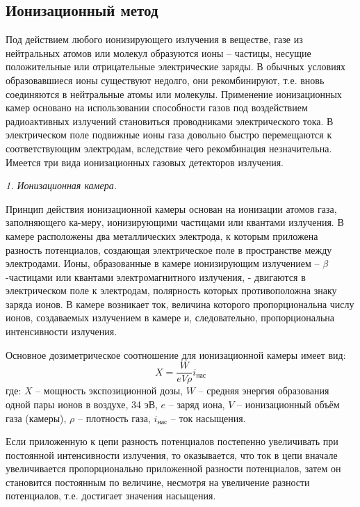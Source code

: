 \documentclass[14pt,pscyr,titlepage]{hedreport}
\begin{document}
	\subsection{Ионизационный метод} 
		Под действием любого ионизирующего излучения в веществе, газе из 
		нейтральных атомов или молекул образуются ионы -- частицы, несущие 
		положительные или отрицательные электрические заряды. В обычных 
		условиях образовавшиеся ионы существуют недолго, они рекомбинируют, 
		т.е. вновь соединяются в нейтральные атомы или молекулы. Применение 
		ионизационных камер основано на использовании способности газов под 
		воздействием радиоактивных излучений становиться проводниками 
		электрического тока. В электрическом поле подвижные ионы газа довольно 
		быстро перемещаются к соответствующим электродам, вследствие чего 
		рекомбинация незначительна. Имеется три вида ионизационных газовых 
		детекторов излучения.

		\emph{1. Ионизационная камера. }

		Принцип действия ионизационной камеры основан на ионизации атомов 
		газа, заполняющего ка-меру, ионизирующими частицами или квантами 
		излучения. В камере расположены два металлических электрода, к 
		которым приложена разность потенциалов, создающая электрическое поле 
		в пространстве между электродами. Ионы, образованные в камере 
		ионизирующим излучением -- \( \beta \)-частицами или квантами 
		электромагнитного излучения, - двигаются в электрическом поле к 
		электродам, полярность которых противоположна знаку заряда ионов. 
		В камере возникает ток, величина которого пропорциональна числу ионов, 
		создаваемых излучением в камере и, следовательно, пропорциональна 
		интенсивности излучения.

		Основное дозиметрическое соотношение для ионизационной камеры имеет 
		вид:
		\[
			X = \frac{W}{eV\rho}i_\text{нас}
		\]
		где: \( X \) -- мощность экспозиционной дозы, \( W \) -- средняя 
		энергия образования одной пары ионов в воздухе, 34 эВ, \( e \) -- 
		заряд иона, \( V \) -- ионизационный объём газа (камеры), 
		\( \rho \) -- плотность газа, \( i_\text{нас} \) -- ток насыщения.

		Если приложенную к цепи разность потенциалов постепенно увеличивать 
		при постоянной интенсивности излучения, то оказывается, что ток в 
		цепи вначале увеличивается пропорционально приложенной разности 
		потенциалов, затем он становится постоянным по величине, несмотря на 
		увеличение разности потенциалов, т.е. достигает значения насыщения.
\end{document}
